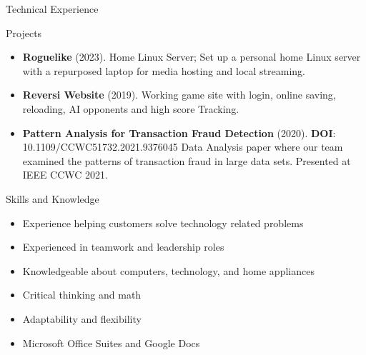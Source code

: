 \documentclass[]{mcdowellcvcustom}
\begin{document}
	\vspace{6mm}
	
	\begin{cvsection}{Technical Experience}
		\begin{cvsubsection}{Projects}{}{}
			\begin{itemize}
				\item \textbf{Roguelike} (2023). Home Linux Server; Set up a personal home Linux server with a repurposed laptop for media hosting and local streaming.
				
				\item \textbf{Reversi Website} (2019). Working game site with login, online saving, reloading, AI opponents and high score Tracking.
				
				\item \textbf{Pattern Analysis for Transaction Fraud Detection} (2020). \textbf{DOI}: 10.1109/CCWC51732.2021.9376045 Data Analysis paper where our team examined the patterns of transaction fraud in large data sets. Presented at IEEE CCWC 2021.
				
			\end{itemize}
		\end{cvsubsection}
	\end{cvsection}
	
	\vspace{6mm}

	\begin{cvsection}{Skills and Knowledge}
		\begin{cvsubsection}{}{}{}	
			\begin{itemize}
				\item Experience helping customers solve technology related problems
				\item Experienced in teamwork and leadership roles
				\item Knowledgeable about computers, technology, and home appliances
				\item Critical thinking and math
				\item Adaptability and flexibility
				\item Microsoft Office Suites and Google Docs
			\end{itemize}
		\end{cvsubsection}
	\end{cvsection}
	
\end{document}
